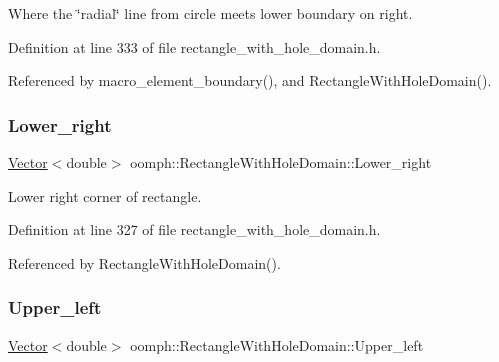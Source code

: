 Where the \char`\"{}radial\char`\"{} line from circle meets lower boundary on right. 



Definition at line 333 of file rectangle\+\_\+with\+\_\+hole\+\_\+domain.\+h.



Referenced by macro\+\_\+element\+\_\+boundary(), and Rectangle\+With\+Hole\+Domain().

\mbox{\label{classoomph_1_1RectangleWithHoleDomain_ab71febd980c61d0c2ba0a76eca053a97}} 
\subsubsection{\texorpdfstring{Lower\+\_\+right}{Lower\_right}}
{\footnotesize\ttfamily \hyperlink{classoomph_1_1Vector}{Vector}$<$double$>$ oomph\+::\+Rectangle\+With\+Hole\+Domain\+::\+Lower\+\_\+right\hspace{0.3cm}{\ttfamily [private]}}



Lower right corner of rectangle. 



Definition at line 327 of file rectangle\+\_\+with\+\_\+hole\+\_\+domain.\+h.



Referenced by Rectangle\+With\+Hole\+Domain().

\mbox{\label{classoomph_1_1RectangleWithHoleDomain_a0e5a29a907836dace560edd72a70917d}} 
\subsubsection{\texorpdfstring{Upper\+\_\+left}{Upper\_left}}
{\footnotesize\ttfamily \hyperlink{classoomph_1_1Vector}{Vector}$<$double$>$ oomph\+::\+Rectangle\+With\+Hole\+Domain\+::\+Upper\+\_\+left\hspace{0.3cm}{\ttfamily [private]}}




